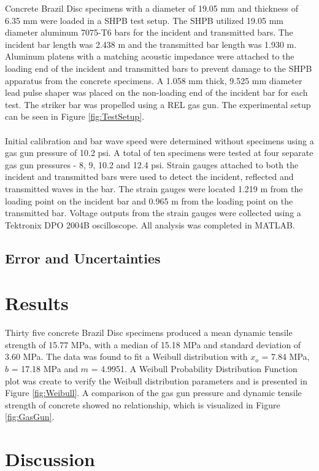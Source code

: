 \documentclass[12pt]{article}
\begin{document}
Concrete Brazil Disc specimens with a diameter of 19.05 mm and thickness of 6.35 mm were loaded in a SHPB test setup. The SHPB utilized 19.05 mm diameter aluminum 7075-T6 bars for the incident and transmitted bars. The incident bar length was 2.438 m and the transmitted bar length was 1.930 m. Aluminum platens with a matching acoustic impedance were attached to the loading end of the incident and transmitted bars to prevent damage to the SHPB apparatus from the concrete specimens. A 1.058 mm thick, 9.525 mm diameter lead pulse shaper was placed on the non-loading end of the incident bar for each test. The striker bar was propelled using a REL gas gun. The experimental setup can be seen in Figure \ref{fig:TestSetup}.
\\ \\
Initial calibration and bar wave speed were determined without specimens using a gas gun pressure of 10.2 psi. A total of ten specimens were tested at four separate gas gun pressures - 8, 9, 10.2 and 12.4 psi. Strain gauges attached to both the incident and transmitted bars were used to detect the incident, reflected and transmitted waves in the bar. The strain gauges were located 1.219 m from the loading point on the incident bar and 0.965 m from the loading point on the transmitted bar. Voltage outputs from the strain gauges were collected using a Tektronix DPO 2004B oscilloscope. All analysis was completed in MATLAB.   

\subsection{Error and Uncertainties} %

\section{Results} %

Thirty five concrete Brazil Disc specimens produced a mean dynamic tensile strength of 15.77 MPa, with a median of 15.18 MPa and standard deviation of 3.60 MPa. The data was found to fit a Weibull distribution with $x_{o}$ = 7.84 MPa, $b$ = 17.18 MPa and $m$ = 4.9951. A Weibull Probability Distribution Function plot was create to verify the Weibull distribution parameters and is presented in Figure \ref{fig:Weibull}. A comparison of the gas gun pressure and dynamic tensile strength of concrete showed no relationship, which is visualized in Figure \ref{fig:GasGun}.

\section{Discussion} %
\end{document}
